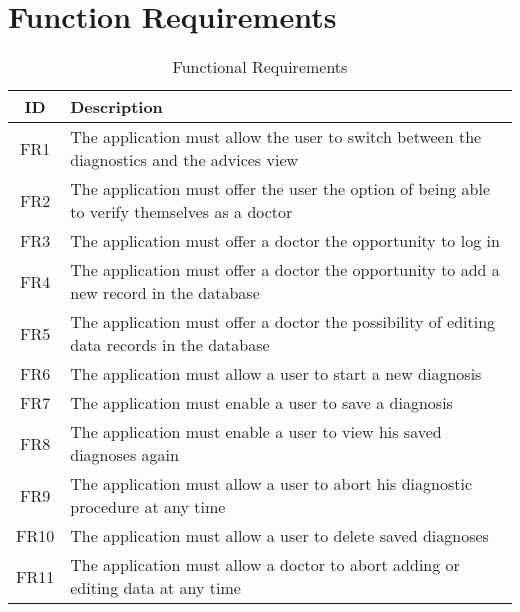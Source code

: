 \section{Function Requirements}
\begin{table}[H]
	\begin{center}
		\scriptsize
		\def\arraystretch{2}%
		\begin{tabular}{ c|l}
			\hline
			\textbf{ID} & \textbf{Description}  \\
			\hline
			FR1 & The application must allow the user to switch between the diagnostics and the advices view  \\
			\hline
			FR2 & The application must offer the user the option of being able to verify themselves as a doctor  \\
			\hline
			FR3 & The application must offer a doctor the opportunity to log in  \\
			\hline
			FR4 & The application must offer a doctor the opportunity to add a new record in the database  \\
			\hline
			FR5 & The application must offer a doctor the possibility of editing data records in the database  \\
			\hline
			FR6 & The application must allow a user to start a new diagnosis  \\
			\hline
			FR7 & The application must enable a user to save a diagnosis  \\
			\hline	
			FR8 & The application must enable a user to view his saved diagnoses again  \\
			\hline
			FR9& The application must allow a user to abort his diagnostic procedure at any time \\
			\hline
			FR10 & The application must allow a user to delete saved diagnoses  \\
			\hline
			FR11 & The application must allow a doctor to abort adding or editing data at any time\\
			\hline
		\end{tabular}
		\normalsize
	\end{center}
	\caption{Functional Requirements}
\end{table}

